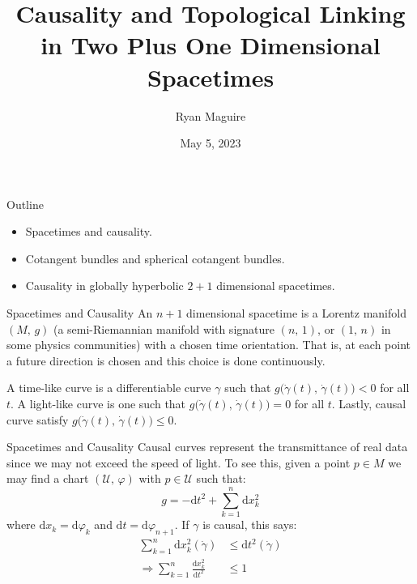 \documentclass{beamer}
\title{Causality and Topological Linking in Two Plus One Dimensional Spacetimes}
\author{Ryan Maguire}
\date{May 5, 2023}
\begin{document}
    \maketitle
    \begin{frame}{Outline}
        \begin{itemize}
            \item Spacetimes and causality.
            \item Cotangent bundles and spherical cotangent bundles.
            \item Causality in globally hyperbolic $2+1$ dimensional spacetimes.
        \end{itemize}
    \end{frame}
    \begin{frame}{Spacetimes and Causality}
        An $n+1$ dimensional spacetime is a Lorentz manifold $(M,\,g)$
        (a semi-Riemannian manifold with signature $(n,\,1)$, or $(1,\,n)$ in
        some physics communities) with a chosen time orientation. That is, at
        each point a future direction is chosen and this choice is done
        continuously.
        \par\hfill\par
        A time-like curve is a differentiable curve $\gamma$ such that
        $g\big(\dot{\gamma}(t),\,\dot{\gamma}(t)\big)<0$ for all $t$. A
        light-like curve is one such that
        $g\big(\dot{\gamma}(t),\,\dot{\gamma}(t)\big)=0$ for all $t$. Lastly,
        causal curve satisfy
        $g\big(\dot{\gamma}(t),\,\dot{\gamma}(t)\big)\leq{0}$.
    \end{frame}
    \begin{frame}{Spacetimes and Causality}
        Causal curves represent the transmittance of real data since we may not
        exceed the speed of light. To see this, given a point $p\in{M}$ we may
        find a chart $(\mathcal{U},\,\varphi)$ with $p\in\mathcal{U}$ such that:
        \begin{equation}
            g=-\textrm{d}t^{2}+\sum_{k=1}^{n}\textrm{d}x_{k}^{2}
        \end{equation}
        where $\textrm{d}x_{k}=\textrm{d}\varphi_{k}$ and
        $\textrm{d}t=\textrm{d}\varphi_{n+1}$. If $\gamma$ is causal, this says:
        \begin{align}
            \sum_{k=1}^{n}\textrm{d}x_{k}^{2}(\dot{\gamma})
                &\leq\textrm{d}t^{2}(\dot{\gamma})\\
            \Rightarrow
            \sum_{k=1}^{n}\frac{\textrm{d}x_{k}^{2}}{\textrm{d}t^{2}}&\leq{1}
        \end{align}
    \end{frame}
\end{document}
